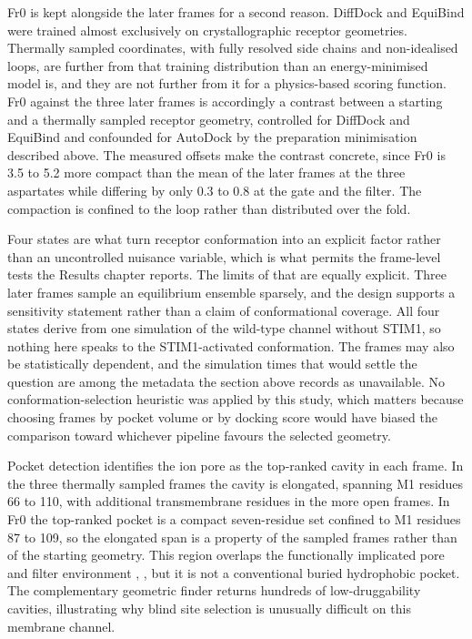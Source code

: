 Fr0 is kept alongside the later frames for a second reason. DiffDock and EquiBind were trained almost exclusively on crystallographic receptor geometries. Thermally sampled coordinates, with fully resolved side chains and non-idealised loops, are further from that training distribution than an energy-minimised model is, and they are not further from it for a physics-based scoring function. Fr0 against the three later frames is accordingly a contrast between a starting and a thermally sampled receptor geometry, controlled for DiffDock and EquiBind and confounded for AutoDock by the preparation minimisation described above. The measured offsets make the contrast concrete, since Fr0 is 3.5 to 5.2\angstrom{} more compact than the mean of the later frames at the three aspartates while differing by only 0.3 to 0.8\angstrom{} at the gate and the filter. The compaction is confined to the loop rather than distributed over the fold.

Four states are what turn receptor conformation into an explicit factor rather than an uncontrolled nuisance variable, which is what permits the frame-level tests the Results chapter reports. The limits of that are equally explicit. Three later frames sample an equilibrium ensemble sparsely, and the design supports a sensitivity statement rather than a claim of conformational coverage. All four states derive from one simulation of the wild-type channel without STIM1, so nothing here speaks to the STIM1-activated conformation. The frames may also be statistically dependent, and the simulation times that would settle the question are among the metadata the section above records as unavailable. No conformation-selection heuristic was applied by this study, which matters because choosing frames by pocket volume or by docking score would have biased the comparison toward whichever pipeline favours the selected geometry.

Pocket detection identifies the ion pore as the top-ranked cavity in each frame. In the three thermally sampled frames the cavity is elongated, spanning M1 residues 66 to 110, with additional transmembrane residues in the more open frames. In Fr0 the top-ranked pocket is a compact seven-residue set confined to M1 residues 87 to 109, so the elongated span is a property of the sampled frames rather than of the starting geometry. This region overlaps the functionally implicated pore and filter environment \cite{ref070}, \cite{ref071}, but it is not a conventional buried hydrophobic pocket. The complementary geometric finder returns hundreds of low-druggability cavities, illustrating why blind site selection is unusually difficult on this membrane channel.

